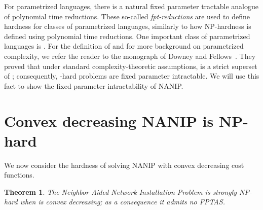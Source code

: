 \documentclass[english]{llncs}
\newtheorem{thm}{Theorem}
\begin{document}
For parametrized languages, there is a natural fixed parameter tractable analogue of polynomial time reductions.
These so-called \emph{fpt-reductions} are used to define hardness for classes of parametrized languages,
similarly to how NP-hardness is defined using polynomial time reductions.
One important class of parametrized languages is . For the definition of  and for more background
on parametrized complexity, we refer the reader to the monograph of Downey and Fellows~\cite{DowneyF13}.
They proved that under standard complexity-theoretic assumptions,  is a strict superset of
; consequently, -hard problems are fixed parameter intractable.
We will use this fact to show the fixed parameter intractability of NANIP.


\section{Convex decreasing NANIP is NP-hard} \label{sec:computation} We now
consider the hardness of solving NANIP with convex decreasing cost functions.

\begin{thm} \label{thm:np-hard} The Neighbor Aided Network Installation Problem
is strongly NP-hard when  is convex decreasing; as a consequence it admits
no FPTAS. \end{thm}
\end{document}
